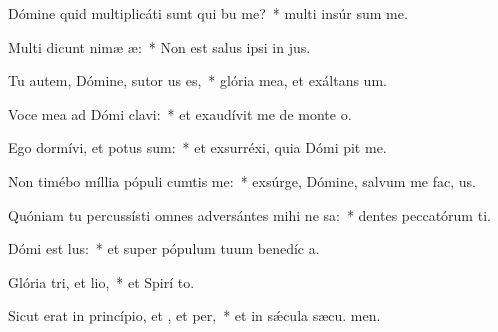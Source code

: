\item Dómine quid multiplicáti sunt qui bu me?~* multi insúr sum me.
\item Multi dicunt nimæ æ:~* Non est salus ipsi in  jus.
\item Tu autem, Dómine, sutor us es,~* glória mea, et exáltans  um.
\item Voce mea ad Dómi clavi:~* et exaudívit me de monte  o.
\item Ego dormívi, et potus sum:~* et exsurréxi, quia Dómi pit me.
\item Non timébo míllia pópuli cumtis me:~* exsúrge, Dómine, salvum me fac,  us.
\item Quóniam tu percussísti omnes adversántes mihi ne sa:~* dentes peccatórum ti.
\item Dómi est lus:~* et super pópulum tuum benedíc a.
\item Glória tri, et lio,~* et Spirí to.
\item Sicut erat in princípio, et , et per,~* et in sǽcula sæcu. men.
